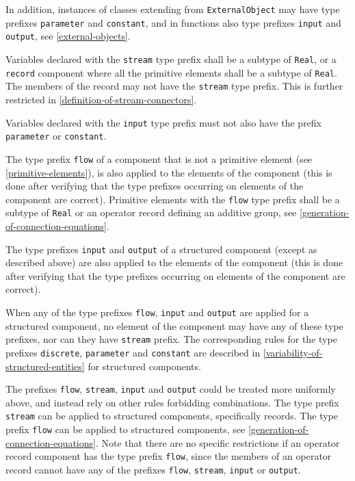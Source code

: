 In addition, instances of classes extending from \lstinline!ExternalObject! may have type prefixes \lstinline!parameter! and \lstinline!constant!, and in functions also type prefixes \lstinline!input! and \lstinline!output!, see \cref{external-objects}.

Variables declared with the \lstinline!stream! type prefix shall be a subtype of \lstinline!Real!, or a \lstinline!record! component where all the primitive elements shall be a subtype of \lstinline!Real!.
The members of the record may not have the \lstinline!stream! type prefix.
This is further restricted in \cref{definition-of-stream-connectors}.

Variables declared with the \lstinline!input! type prefix must not also have the prefix \lstinline!parameter! or \lstinline!constant!.

The type prefix \lstinline!flow! of a component that is not a primitive element (see \cref{primitive-elements}), is also applied to the elements of the component (this is done after verifying that the type prefixes occurring on elements of the component are correct).
Primitive elements with the \lstinline!flow! type prefix shall be a subtype of \lstinline!Real! or an operator record defining an additive group, see \cref{generation-of-connection-equations}.

The type prefixes \lstinline!input! and \lstinline!output! of a structured component (except as described above) are also applied to the elements of the component (this is done after verifying that the type prefixes occurring on elements of the component are correct).

When any of the type prefixes \lstinline!flow!, \lstinline!input! and \lstinline!output! are applied for a structured component, no element of the component may have any of these type prefixes, nor can they have \lstinline!stream! prefix.
The corresponding rules for the type prefixes \lstinline!discrete!, \lstinline!parameter! and \lstinline!constant! are described in \cref{variability-of-structured-entities} for structured components.

\begin{nonnormative}
The prefixes \lstinline!flow!, \lstinline!stream!, \lstinline!input! and \lstinline!output! could be treated more uniformly above, and instead rely on other rules forbidding combinations.
The type prefix \lstinline!stream! can be applied to structured components, specifically records.
The type prefix \lstinline!flow! can be applied to structured components, see \cref{generation-of-connection-equations}.
Note that there are no specific restrictions if an operator record component has the type prefix \lstinline!flow!, since the members of an operator record cannot have any of the prefixes \lstinline!flow!, \lstinline!stream!, \lstinline!input! or \lstinline!output!.
\end{nonnormative}

